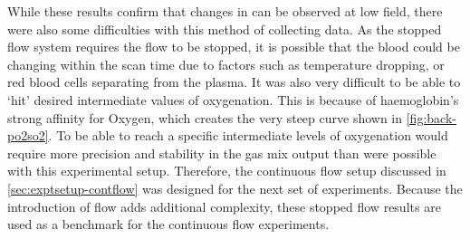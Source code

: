 While these results confirm that changes in \SOtwo can be observed at low field, there were also some difficulties with this method of collecting data.
As the stopped flow system requires the flow to be stopped, it is possible that the blood could be changing within the scan time due to factors such as temperature dropping, or red blood cells separating from the plasma.
It was also very difficult to be able to `hit' desired intermediate values of oxygenation.
This is because of haemoglobin's strong affinity for Oxygen, which creates the very steep curve shown in \autoref{fig:back-po2so2}.
To be able to reach a specific intermediate levels of oxygenation would require more precision and stability in the gas mix output than were possible with this experimental setup.
Therefore, the continuous flow setup discussed in \autoref{sec:exptsetup-contflow} was designed for the next set of experiments.
Because the introduction of flow adds additional complexity, these stopped flow results are used as a benchmark for the continuous flow experiments.
